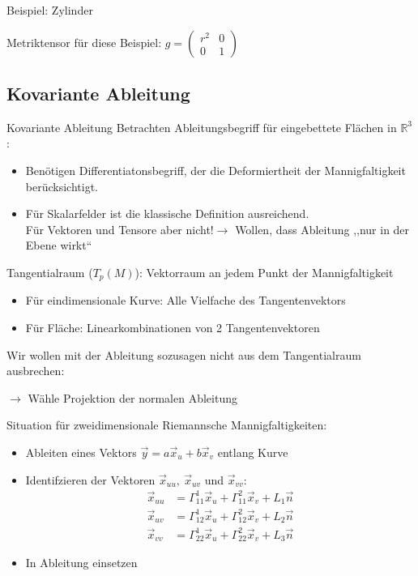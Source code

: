 \documentclass[mathserif]{beamer}
\newcommand{\vx}{\vec{x}}
\newcommand{\vy}{\vec{y}}
\theoremstyle{definition}
\begin{document}
	\begin{frame}
		Beispiel: Zylinder\\
		\begin{center}
			
		\end{center}
		Metriktensor f\"ur diese Beispiel: $g=\left(\begin{array}{cc} r^2 & 0 \\ 0 & 1 \end{array}\right)$
	\end{frame}
\subsection{Kovariante Ableitung}
	\begin{frame}{Kovariante Ableitung}
		Betrachten Ableitungsbegriff für eingebettete Fl\"achen in $\mathbb{R}^3$:
		\begin{itemize}
		\item Benötigen Differentiatonsbegriff, der die Deformiertheit der Mannigfaltigkeit berücksichtigt.\\
		\pause
		\item Für Skalarfelder ist die klassische Definition ausreichend.\\
		Für Vektoren und Tensore aber nicht!$\rightarrow$ Wollen, dass Ableitung ,,nur in der Ebene wirkt``\\
		\pause
		\end{itemize}
	\end{frame}
	\begin{frame}
		Tangentialraum ($T_p(M)$): Vektorraum an jedem Punkt der Mannigfaltigkeit
		\begin{itemize}
			\item Für eindimensionale Kurve: Alle Vielfache des Tangentenvektors
			\item Für Fläche: Linearkombinationen von 2 Tangentenvektoren
		\end{itemize}
		\pause
		Wir wollen mit der Ableitung sozusagen nicht aus dem Tangentialraum ausbrechen:
		\begin{center}
		$\rightarrow$ Wähle Projektion der normalen Ableitung
		\end{center}
	\end{frame}
	\begin{frame}
		Situation für zweidimensionale Riemannsche Mannigfaltigkeiten:
		\begin{itemize}
			\item Ableiten eines Vektors $\vy=a \vx_u+b\vx_v$ entlang Kurve
			\pause
			\item Identifzieren der Vektoren $\vx_{uu},\ \vx_{uv}$ und $\vx_{vv}$:
				\begin{align*}
					\vec{x}_{uu}&=\Gamma^1_{11} \vx_u+\Gamma^2_{11}\vx_v+L_1 \vec{n}\\
					\vx_{uv}&=\Gamma^1_{12}\vx_u+\Gamma^2_{12}\vx_v +L_2 \vec{n}\\
					\vx_{vv}&=\Gamma^1_{22}\vx_u+\Gamma^2_{22}\vx_v+L_3 \vec{n}
				\end{align*}
			\pause
			\item In Ableitung einsetzen
		\end{itemize}
	\end{frame}
	
\end{document}
